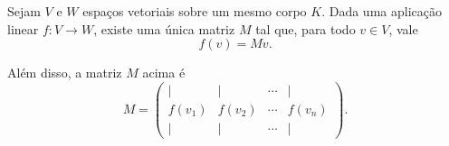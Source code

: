 \documentclass[10pt, a4paper]{article}
\begin{document}
\begin{thm}
	Sejam $V$ e $W$ espaços vetoriais sobre um mesmo corpo $K$. Dada uma aplicação linear $f: V \to W$, existe uma única matriz $M$ tal que, para todo $v \in V$, vale
	\[f(v) = Mv.\]

	Além disso, a matriz $M$ acima é \[
		M = 
	\begin{pmatrix}
		\vert  & \vert  & \cdots & \vert  \\
		f(v_1) & f(v_2) & \cdots & f(v_n) \\
		\vert  & \vert  & \cdots & \vert  
	\end{pmatrix}
	.
	\]
\end{thm}
\end{document}
